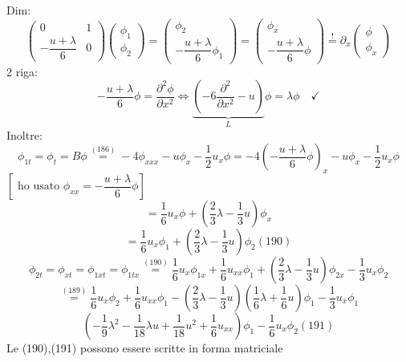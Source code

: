 \documentclass[a4paper,11pt]{report}
\begin{document}
Dim:
$$
\left(\begin{matrix}
0 & 1 \\
-\dfrac{u+\lambda}{6} & 0
\end{matrix}\right)\left( \begin{matrix}
\phi_1 \\
\phi_2
\end{matrix} \right) = \left(\begin{matrix}
\phi_2 \\
-\dfrac{u+\lambda}{6}\phi_1
\end{matrix}\right) = \left(\begin{matrix}
\phi_x \\
-\dfrac{u+\lambda}{6}\phi
\end{matrix}\right)\overset{!}{=} \partial_x \left(\begin{matrix}
\phi \\
\phi_x
\end{matrix}\right)
$$
2 riga: 
$$
-\dfrac{u+\lambda}{6}\phi = \dfrac{\partial^2 \phi}{\partial x^2} \Leftrightarrow \underset{L}{\underbrace{\left(-6\dfrac{\partial^2}{\partial x^2} - u\right)}}\phi = \lambda \phi \quad \checkmark
$$
Inoltre:
$$
\phi_{1t}=\phi_t=B\phi \overset{(186)}{=} - 4\phi_{xxx} - u\phi_x - \dfrac{1}{2}u_x\phi =-4 \left(-\dfrac{u+\lambda}{6}\phi\right)_x - u\phi_x - \dfrac{1}{2}u_x\phi 
$$
$\left[\text{ ho usato } \phi_{xx}=-\dfrac{u+\lambda}{6} \phi\right]$
$$
=\dfrac{1}{6} u_x \phi + \left(\dfrac{2}{3}\lambda - \dfrac{1}{3}u\right)\phi_x
$$
\begin{equation}
=\dfrac{1}{6} u_x \phi_1 + \left(\dfrac{2}{3}\lambda - \dfrac{1}{3}u\right)\phi_2 (190)
\end{equation}
$$
\phi_{2t}=\phi_{xt}=\phi_{1xt}=\phi_{1tx} \overset{(190)}{=} \dfrac{1}{6}u_x\phi_{1x} + \dfrac{1}{6}u_{xx}\phi_1 + \left(\dfrac{2}{3}\lambda - \dfrac{1}{3}u\right)\phi_{2x} - \dfrac{1}{3}u_x\phi_2
$$
$$
\overset{(189)}{=}\dfrac{1}{6}u_x\phi_2 + \dfrac{1}{6}u_{xx}\phi_1 - \left(\dfrac{2}{3}\lambda - \dfrac{1}{3}u\right)\left(\dfrac{1}{6}\lambda + \dfrac{1}{6}u \right)\phi_1-\dfrac{1}{3}u_x\phi_1
$$
\begin{equation}
\left(-\dfrac{1}{9}\lambda^2 - \dfrac{1}{18} \lambda u + \dfrac{1}{18}u^2 + \dfrac{1}{6}u_{xx}\right)\phi_1 - \dfrac{1}{6}u_x\phi_2 (191)
\end{equation}
Le (190),(191) possono essere scritte in forma matriciale
\end{document}
